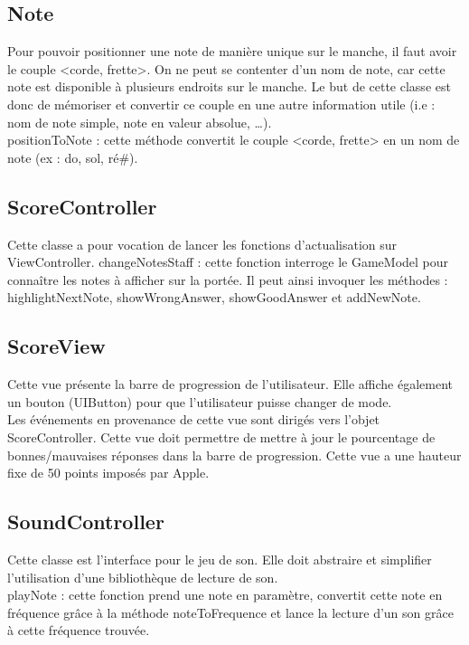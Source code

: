 \documentclass{scrreprt}
\begin{document}
\subsection{Note}

Pour pouvoir positionner une note de manière unique sur le manche, il faut avoir le couple <corde, frette>. On ne peut se contenter d'un nom de note, car cette note est disponible à plusieurs endroits sur le manche. Le but de cette classe est donc de mémoriser et convertir ce couple en une autre information utile (i.e : nom de note simple, note en valeur absolue, …).\\
positionToNote : cette méthode convertit le couple <corde, frette> en un nom de note (ex : do, sol, ré\#).

\subsection{ScoreController}

Cette classe a pour vocation de lancer les fonctions d’actualisation sur ViewController.
changeNotesStaff : cette fonction interroge le GameModel pour connaître les notes à afficher sur la portée. Il peut ainsi invoquer les méthodes : highlightNextNote, showWrongAnswer, showGoodAnswer et addNewNote. 


\subsection{ScoreView}

Cette vue présente la barre de progression de l’utilisateur. Elle affiche également un bouton (UIButton) pour que l’utilisateur puisse changer de mode.\\
Les événements en provenance de cette vue sont dirigés vers l’objet ScoreController.
Cette vue doit permettre de mettre à jour le pourcentage de bonnes/mauvaises réponses dans la barre de progression. Cette vue a une hauteur fixe de 50 points imposés par Apple.


\subsection{SoundController}

Cette classe est l’interface pour le jeu de son. Elle doit abstraire et simplifier l’utilisation d’une bibliothèque de lecture de son.\\
playNote : cette fonction prend une note en paramètre, convertit cette note en fréquence grâce à la méthode noteToFrequence et lance la lecture d’un son grâce à cette fréquence trouvée.
\end{document}
